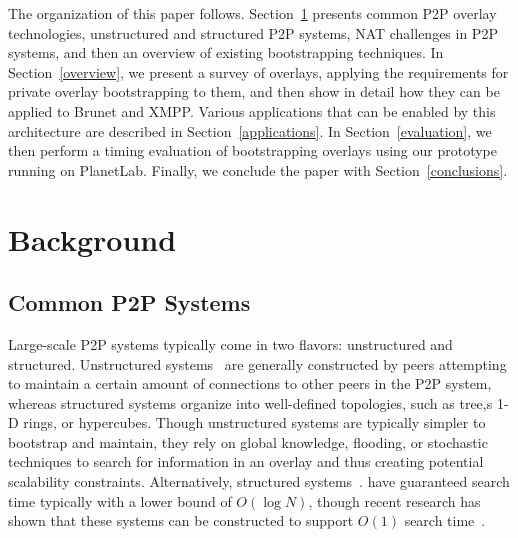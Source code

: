 \documentclass[conference]{IEEEtran}
\begin{document}
The organization of this paper follows.  Section~\ref{background} presents
common P2P overlay technologies, unstructured and structured P2P systems, NAT
challenges in P2P systems, and then an overview of existing bootstrapping
techniques.  In Section~\ref{overview}, we present a survey of overlays,
applying the requirements for private overlay bootstrapping to them, and then
show in detail how they can be applied to Brunet and XMPP.  Various
applications that can be enabled by this architecture are described in
Section~\ref{applications}.  In Section~\ref{evaluation}, we then perform a
timing evaluation of bootstrapping overlays using our prototype running on
PlanetLab.  Finally, we conclude the paper with Section~\ref{conclusions}.

\section{Background}
\label{background}
\subsection{Common P2P Systems}

Large-scale P2P systems typically come in two flavors:  unstructured and
structured.  Unstructured systems~\cite{gnutella, fasttrack} are generally
constructed by peers attempting to maintain a certain amount of connections to
other peers in the P2P system, whereas structured systems organize into
well-defined topologies, such as tree,s 1-D rings, or hypercubes.  Though
unstructured systems are typically simpler to bootstrap and maintain, they rely
on global knowledge, flooding, or stochastic techniques to search for
information in an overlay and thus creating potential scalability constraints.
Alternatively, structured systems~\cite{pastry, chord, symphony, kademlia,
can}.  have guaranteed search time typically with a lower bound of $O(\log N)$,
though recent research has shown that these systems can be constructed to
support $O(1)$ search time~\cite{beehive}.  
\end{document}
